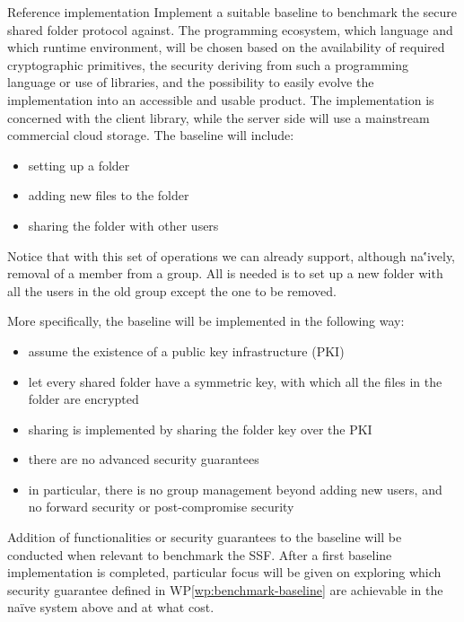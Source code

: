 \documentclass[E]{BAMASA}
\begin{document}
\begin{workpackage}{Reference implementation}\label{wp:benchmark-baseline}
	Implement a suitable baseline to benchmark the secure shared folder protocol against.
    The programming ecosystem, which language and which runtime environment, will be 
    chosen based on the availability of required cryptographic primitives, 
    the security deriving from such a programming language or use of libraries,
    and the possibility to easily evolve the implementation into an accessible and usable product.
    The implementation is concerned with the client library, while the server side will use a 
    mainstream commercial cloud storage.
    The baseline will include:
    \begin{itemize}
		\item setting up a folder
		\item adding new files to the folder
		\item sharing the folder with other users
	\end{itemize}
    Notice that with this set of operations we can already support, although na\''ively, removal of 
    a member from a group. All is needed is to set up a new folder with all the users in the old group
    except the one to be removed.

    More specifically, the baseline will be implemented in the following way:
    \begin{itemize}
        \item assume the existence of a public key infrastructure (PKI)
        \item let every shared folder have a symmetric key, with which all the files in the 
                folder are encrypted
        \item sharing is implemented by sharing the folder key over the PKI
        \item there are no advanced security guarantees
        \item in particular, there is no group management beyond adding new users, and no forward 
                security or post-compromise security
    \end{itemize}

    Addition of functionalities or security guarantees to the baseline will be conducted 
    when relevant to benchmark the SSF. 
    After a first baseline implementation is completed,
    particular focus will be given on exploring which security 
    guarantee defined in WP\ref{wp:benchmark-baseline} are achievable 
    in the na\"ive system above and at what cost.

\end{workpackage}
\end{document}
